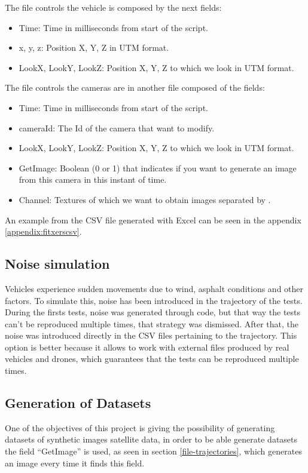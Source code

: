 \documentclass[10pt,a4paper,twocolumn,twoside]{article}
\begin{document}
The file controls the vehicle is composed by the next fields:

\begin{itemize}
\setlength\itemsep{0em}
\item Time: Time in milliseconds from start of the script.
\item x, y, z: Position X, Y, Z in UTM format.
\item LookX, LookY, LookZ: Position X, Y, Z to which we look in UTM format.
\end{itemize}

The file controls the cameras are in another file composed of the fields:

\begin{itemize}
\setlength\itemsep{0em}
\item Time: Time in milliseconds from start of the script.
\item cameraId: The Id of the camera that want to modify.
\item LookX, LookY, LookZ: Position X, Y, Z to which we look in UTM format.
\item GetImage: Boolean (0 or 1) that indicates if you want to generate an image from this camera in this instant of time.
\item Channel: Textures of which we want to obtain images separated by \textbar.
\end{itemize}

An example from the CSV file generated with Excel can be seen in the appendix \ref{appendix:fitxerscsv}.

\subsection{Noise simulation}

Vehicles experience sudden movements due to wind, asphalt conditions and other factors. To simulate this, noise has been introduced in the trajectory of the tests. During the firsts tests, noise was generated through code, but that way the tests can't be reproduced multiple times, that strategy was dismissed. After that, the noise was introduced directly in the CSV files pertaining to the trajectory. This option is better because it allows to work with external files produced by real vehicles and drones, which guarantees that the tests can be reproduced multiple times.

\subsection{Generation of Datasets}
One of the objectives of this project is giving the possibility of generating datasets of synthetic images satellite data, in order to be able generate datasets the field ``GetImage'' is used, as seen in section \ref{file-trajectories}, which generates an image every time it finds this field.
\end{document}
